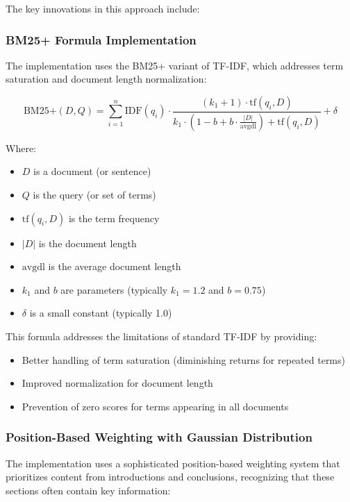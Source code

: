 \documentclass[12pt,a4paper]{article}
\begin{document}
The key innovations in this approach include:

\subsubsection{BM25+ Formula Implementation}

The implementation uses the BM25+ variant of TF-IDF, which addresses term saturation and document length normalization:

\begin{equation}
\text{BM25+}(D,Q) = \sum_{i=1}^{n} \text{IDF}(q_i) \cdot \frac{(k_1 + 1) \cdot \text{tf}(q_i, D)}{k_1 \cdot (1 - b + b \cdot \frac{|D|}{\text{avgdl}}) + \text{tf}(q_i, D)} + \delta
\end{equation}

Where:
\begin{itemize}
    \item $D$ is a document (or sentence)
    \item $Q$ is the query (or set of terms)
    \item $\text{tf}(q_i, D)$ is the term frequency
    \item $|D|$ is the document length
    \item $\text{avgdl}$ is the average document length
    \item $k_1$ and $b$ are parameters (typically $k_1 = 1.2$ and $b = 0.75$)
    \item $\delta$ is a small constant (typically 1.0)
\end{itemize}

This formula addresses the limitations of standard TF-IDF by providing:
\begin{itemize}
    \item Better handling of term saturation (diminishing returns for repeated terms)
    \item Improved normalization for document length
    \item Prevention of zero scores for terms appearing in all documents
\end{itemize}

\subsubsection{Position-Based Weighting with Gaussian Distribution}

The implementation uses a sophisticated position-based weighting system that prioritizes content from introductions and conclusions, recognizing that these sections often contain key information:
\end{document}
